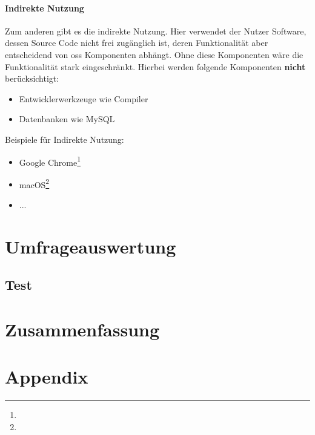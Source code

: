 \documentclass[a4paper]{article}
\begin{document}
            \paragraph{Indirekte Nutzung}
                Zum anderen gibt es die indirekte Nutzung. Hier verwendet der Nutzer Software, dessen Source Code nicht frei zugänglich ist, deren Funktionalität aber entscheidend von \gls{oss} Komponenten abhängt. Ohne diese Komponenten wäre die Funktionalität stark eingeschränkt. Hierbei werden folgende Komponenten \textbf{nicht} berücksichtigt:
                
                \begin{itemize}
                    \item Entwicklerwerkzeuge wie Compiler
                    \item Datenbanken wie MySQL
                \end{itemize}
                
                Beispiele für Indirekte Nutzung:
                \begin{itemize}
                    \item Google Chrome\footnote{}
                    \item macOS\footnote{}
                    \item ... %
                \end{itemize}
        
    \section{Umfrageauswertung}
        \subsection{Test}
    
    \section{Zusammenfassung}
    
    \clearpage
    \section*{Appendix}
    
        \printglossary[type=\acronymtype]
        \printglossary
        
        \clearpage
        \nocite{*}
        \printbibliography
\end{document}
